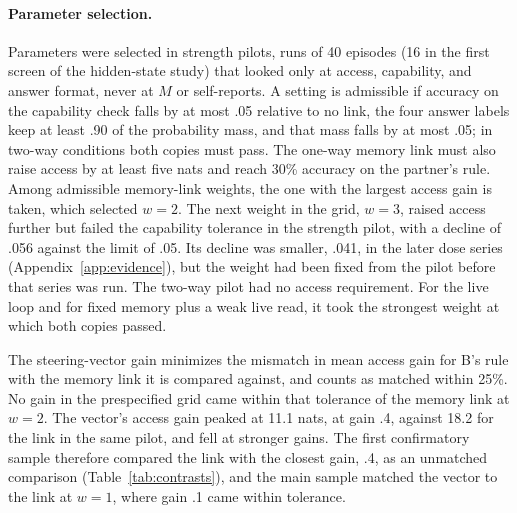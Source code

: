 \paragraph{Parameter selection.}
Parameters were selected in strength pilots, runs of 40 episodes (16 in
the first screen of the hidden-state study) that looked only at access,
capability, and answer format, never at $M$ or self-reports.
A setting is admissible if accuracy on the capability check falls by at
most .05 relative to no link, the four answer labels keep at least .90
of the probability mass, and that mass falls by at most .05; in two-way
conditions both copies must pass. The one-way memory link must also
raise access by at least five nats and reach 30\% accuracy on the
partner's rule.
Among admissible memory-link weights, the one with the largest access
gain is taken, which selected $w=2$. The next weight in the grid, $w=3$,
raised access further but failed the capability tolerance in the
strength pilot, with a decline of .056 against the limit of .05. Its
decline was smaller, .041, in the later dose series
(Appendix~\ref{app:evidence}), but the weight had been fixed from the
pilot before that series was run. The two-way pilot had no access
requirement. For the live loop and for fixed memory plus a weak live
read, it took the strongest weight at which both copies passed.

The steering-vector gain minimizes the mismatch in mean access gain for B's
rule with the memory link it is compared against, and counts as
matched within 25\%.
No gain in the prespecified grid came within that tolerance of the
memory link at $w=2$. The vector's access gain peaked at 11.1 nats, at
gain .4, against 18.2 for the link in the same pilot, and fell at
stronger gains. The first confirmatory sample therefore compared the
link with the closest gain, .4, as an unmatched comparison
(Table~\ref{tab:contrasts}), and the main sample matched the vector to
the link at $w=1$, where gain .1 came within tolerance.

